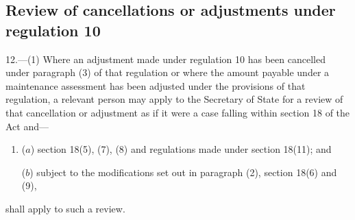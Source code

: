 \documentclass[a4paper]{article}
\begin{document}
%
%
%
%


\subsection[12. Review of cancellations or adjustments under regulation 10]{Review of cancellations or adjustments under regulation 10}

\begin{sloppypar}
12.—(1) Where an adjustment made under regulation 10 has been cancelled under paragraph (3) of that regulation or where the amount payable under a maintenance assessment has been adjusted under the provisions of that regulation, a relevant person may apply to the Secretary of State for a review of that cancellation or adjustment as if it were a case falling within section 18 of the Act and—
\end{sloppypar}
\begin{enumerate}\item[]
($a$) section 18(5), (7), (8) and regulations made under section 18(11); and

($b$) subject to the modifications set out in paragraph (2), section 18(6) and (9),
\end{enumerate}
shall apply to such a review.
\end{document}
